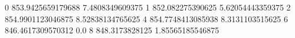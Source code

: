 0 853.9425659179688 7.4808349609375
1 852.082275390625 5.62054443359375
2 854.9901123046875 8.52838134765625
4 854.7748413085938 8.3131103515625
6 846.4617309570312 0.0
8 848.3173828125 1.85565185546875
